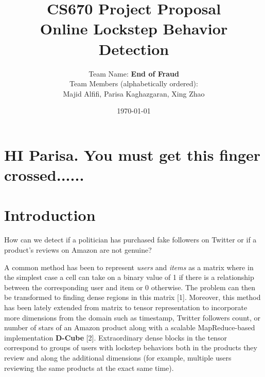 \documentclass[12pt]{article}
\begin{document}
 
 
\title{CS670 Project Proposal\\Online Lockstep Behavior Detection}
\author{
Team Name: \textbf{End of Fraud}\\[2ex]
\small{Team Members (alphabetically ordered):}\\
Majid Alfifi, Parisa Kaghazgaran,  Xing Zhao
}

\date{\today}
 
\maketitle
 
 
 \section{HI Parisa. You must get this finger crossed......}
\section{Introduction}
 

How can we detect if a politician has purchased fake followers on Twitter or if a product's reviews on Amazon are not genuine?

A common method has been to represent \emph{users} and \emph{items} as a matrix where in the simplest case a cell can take on a binary value of 1 if there is a relationship between the corresponding user and item or 0 otherwise. The problem can then be transformed to finding dense regions in this matrix [1]. Moreover, this method has been lately extended from matrix to tensor representation to incorporate more dimensions from the domain such as timestamp, Twitter followers count, or number of stars of an Amazon product along with a scalable MapReduce-based implementation \textbf{D-Cube} [2]. Extraordinary dense blocks in the tensor correspond to groups of users with lockstep behaviors both in the products they review and along the additional dimensions (for example, multiple users reviewing the same products at the exact same time). 
\end{document}
